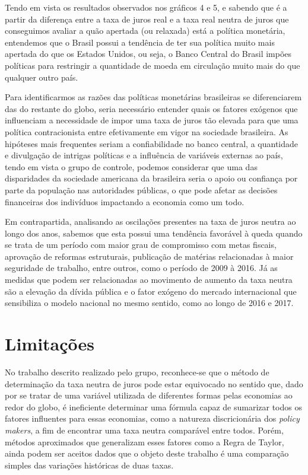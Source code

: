  Tendo em vista os resultados observados nos gr\'{a}ficos 4 e 5, e sabendo que \'{e} a partir da diferen\c{c}a entre a taxa de juros real e a taxa real neutra de juros que conseguimos avaliar a qu\~{a}o apertada (ou relaxada) est\'{a} a pol\'{i}tica monet\'{a}ria, entendemos que o Brasil possui a tend\^{e}ncia de ter sua pol\'{i}tica muito mais apertada do que os Estados Unidos, ou seja, o Banco Central do Brasil imp\~{o}es pol\'{i}ticas para restringir a quantidade de moeda em circula\c{c}\~{a}o muito mais do que qualquer outro pa\'{i}s. 

 Para identificarmos as raz\~{o}es das pol\'{i}ticas monet\'{a}rias brasileiras se diferenciarem das do restante do globo, seria necess\'{a}rio entender quais os fatores ex\'{o}genos que influenciam a necessidade de impor uma taxa de juros t\~{a}o elevada para que uma pol\'{i}tica contracionista entre efetivamente em vigor na sociedade brasileira. As hip\'{o}teses mais frequentes seriam a confiabilidade no banco central, a quantidade e divulga\c{c}\~{a}o de intrigas pol\'{i}ticas e a influ\^{e}ncia de vari\'{a}veis externas ao pa\'{i}s, tendo em vista o grupo de controle, podemos considerar que uma das disparidades da sociedade americana da brasileira seria o apoio ou confian\c{c}a por parte da popula\c{c}\~{a}o nas autoridades p\'{u}blicas, o que pode afetar as decis\~{o}es financeiras dos indiv\'{i}duos impactando a economia como um todo. 

 Em contrapartida, analisando as oscila\c{c}\~{o}es presentes na taxa de juros neutra ao longo dos anos, sabemos que esta possui uma tend\^{e}ncia favor\'{a}vel \`{a} queda quando se trata de um per\'{i}odo com maior grau de compromisso com metas fiscais, aprova\c{c}\~{a}o de reformas estruturais, publica\c{c}\~{a}o de mat\'{e}rias relacionadas \`{a} maior seguridade de trabalho, entre outros, como o per\'{i}odo de 2009 \`{a} 2016. J\'{a} as medidas que podem ser relacionadas ao movimento de aumento da taxa neutra s\~{a}o a eleva\c{c}\~{a}o da d\'{i}vida p\'{u}blica e o fator ex\'{o}geno do mercado internacional que sensibiliza o modelo nacional no mesmo sentido, como ao longo de 2016 e 2017.  

\section*{Limita\c{c}\~{o}es }

 No trabalho descrito realizado pelo grupo, reconhece-se que o m\'{e}todo de determina\c{c}\~{a}o da taxa neutra de juros pode estar equivocado no sentido que, dado por se tratar de uma vari\'{a}vel utilizada de diferentes formas pelas economias ao redor do globo, \'{e} ineficiente determinar uma f\'{o}rmula capaz de sumarizar todos os fatores influentes para essas economias, como a natureza discricion\'{a}ria dos \textit{policy makers}, a fim de encontrar uma taxa neutra compar\'{a}vel entre todos. Por\'{e}m, m\'{e}todos aproximados que generalizam esses fatores como a Regra de Taylor, ainda podem ser aceitos dados que o objeto deste trabalho \'{e} uma compara\c{c}\~{a}o simples das varia\c{c}\~{o}es hist\'{o}ricas de duas taxas. 

